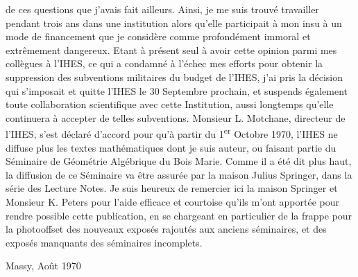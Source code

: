 de ces questions que j'avais fait ailleurs. Ainsi, je me suis trouvé travailler pendant trois ans dans une institution alors qu'elle participait à mon insu à un mode de financement que je considère comme profondément immoral et extrêmement dangereux. Etant à présent seul à avoir cette opinion parmi mes collègues à l'IHES, ce qui a condamné à l'échec mes efforts pour obtenir la suppression des subventions militaires du budget de l'IHES, j'ai pris la décision qui s'imposait et quitte l'IHES le 30 Septembre prochain, et suspends également toute collaboration scientifique avec cette Institution, aussi longtemps qu'elle continuera à accepter de telles subventions. Monsieur L. Motchane, directeur de l'IHES, s'est déclaré d'accord pour qu'à partir du 1\textsuperscript{er} Octobre 1970, l'IHES ne diffuse plus les textes mathématiques dont je suis auteur, ou faisant partie du Séminaire de Géométrie Algébrique du Bois Marie. Comme il a été dit plus haut, la diffusion de ce Séminaire va être assurée par la maison Julius Springer, dans la série des Lecture Notes. Je suis heureux de remercier ici la maison Springer et Monsieur K. Peters pour l'aide efficace et courtoise qu'ils m'ont apportée pour rendre possible cette publication, en se chargeant en particulier de la frappe pour la photooffset des nouveaux exposés rajoutés aux anciens séminaires, et des exposés manquants des séminaires incomplets.

\begin{flushright}
Massy, Août 1970\\
\end{flushright}

